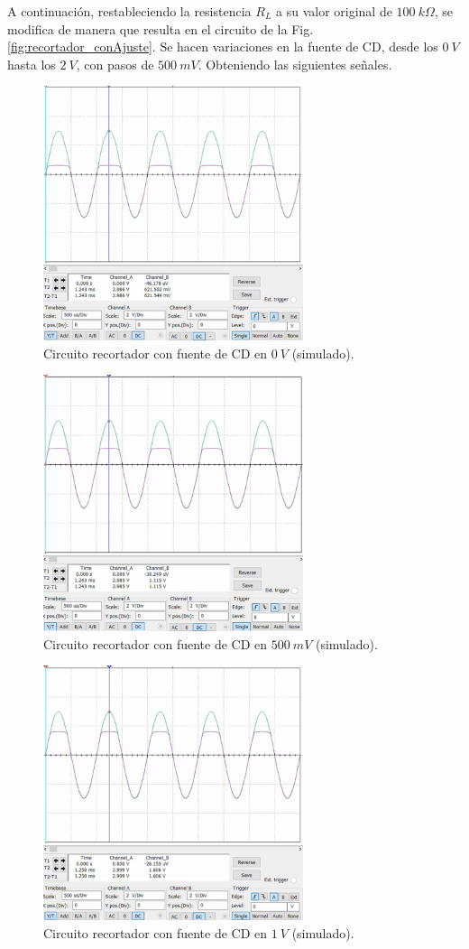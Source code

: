 \documentclass[journal]{IEEEtran}
\begin{document}
A continuación, restableciendo la resistencia $R_L$ a su valor original de $100~k\Omega$, se modifica de manera que resulta en el circuito de la Fig. \ref{fig:recortador_conAjuste}.
Se hacen variaciones en la fuente de CD, desde los $0~V$ hasta los $2~V$, con pasos de $500~mV$. Obteniendo las siguientes señales.
\begin{figure}[H]
        \centering
        \includegraphics[width=3in]{SignalSimulated_05.png}
        \caption{Circuito recortador con fuente de CD en $0~V$ (simulado).}
        \label{fig:SignalSimulated_05}
\end{figure}
\begin{figure}[H]
        \centering
        \includegraphics[width=3in]{SignalSimulated_06.png}
        \caption{Circuito recortador con fuente de CD en $500~mV$ (simulado).}
        \label{fig:SignalSimulated_06}
\end{figure}
\begin{figure}[H]
        \centering
        \includegraphics[width=3in]{SignalSimulated_07.png}
        \caption{Circuito recortador con fuente de CD en $1~V$ (simulado).}
        \label{fig:SignalSimulated_07}
\end{figure}
\end{document}
